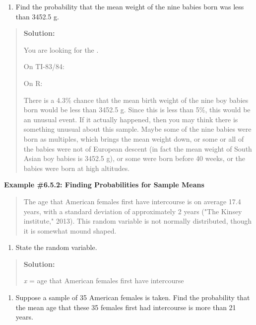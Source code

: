 \documentclass[]{book}
\providecommand{\tightlist}{%
  \setlength{\itemsep}{0pt}\setlength{\parskip}{0pt}}
\begin{document}
\begin{enumerate}
\def\labelenumi{\alph{enumi}.}
\setcounter{enumi}{5}
\tightlist
\item
  Find the probability that the mean weight of the nine babies born
  was less than 3452.5 g.
\end{enumerate}

\begin{quote}
\textbf{Solution:}

You are looking for the .

On TI-83/84:

On R:

There is a 4.3\% chance that the mean birth weight of the nine boy
babies born would be less than 3452.5 g. Since this is less than 5\%,
this would be an unusual event. If it actually happened, then you may
think there is something unusual about this sample. Maybe some of the
nine babies were born as multiples, which brings the mean weight down,
or some or all of the babies were not of European descent (in fact the
mean weight of South Asian boy babies is 3452.5 g), or some were born
before 40 weeks, or the babies were born at high altitudes.
\end{quote}

\textbf{Example \#6.5.2: Finding Probabilities for Sample Means}

\begin{quote}
The age that American females first have intercourse is on average
17.4 years, with a standard deviation of approximately 2 years ("The
Kinsey institute," 2013). This random variable is not normally
distributed, though it is somewhat mound shaped.
\end{quote}

\begin{enumerate}
\def\labelenumi{\alph{enumi}.}
\tightlist
\item
  State the random variable.
\end{enumerate}

\begin{quote}
\textbf{Solution:}

\emph{x} = age that American females first have intercourse
\end{quote}

\begin{enumerate}
\def\labelenumi{\alph{enumi}.}
\setcounter{enumi}{1}
\tightlist
\item
  Suppose a sample of 35 American females is taken. Find the
  probability that the mean age that these 35 females first had
  intercourse is more than 21 years.
\end{enumerate}
\end{document}
